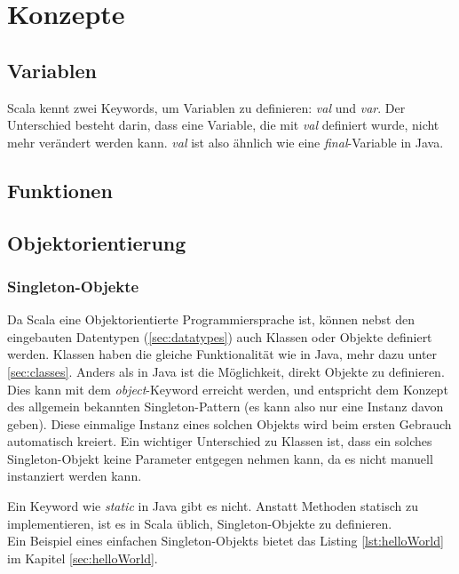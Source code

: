 \chapter{Konzepte}

\section{Variablen}

Scala kennt zwei Keywords, um Variablen zu definieren: \emph{val} und 
\emph{var}. Der Unterschied besteht darin, dass eine Variable, die mit
\emph{val} definiert wurde, nicht mehr verändert werden kann. \emph{val}
ist also ähnlich wie eine \emph{final}-Variable in Java.

\section{Funktionen}


\section{Objektorientierung}

\subsection{Singleton-Objekte}

Da Scala eine Objektorientierte Programmiersprache ist, können nebst
den eingebauten Datentypen (\ref{sec:datatypes}) auch Klassen oder
Objekte definiert werden. Klassen haben die gleiche Funktionalität
wie in Java, mehr dazu unter \ref{sec:classes}.  Anders als in Java
ist die Möglichkeit, direkt Objekte zu definieren.  Dies kann mit dem
\emph{object}-Keyword erreicht werden, und entspricht dem Konzept des
allgemein bekannten Singleton-Pattern (es kann also nur eine Instanz davon
geben). Diese einmalige Instanz eines solchen Objekts wird beim ersten
Gebrauch automatisch kreiert. Ein wichtiger Unterschied zu Klassen ist,
dass ein solches Singleton-Objekt keine Parameter entgegen nehmen kann,
da es nicht manuell instanziert werden kann.

Ein Keyword wie \emph{static} in Java gibt es nicht. Anstatt Methoden
statisch zu implementieren, ist es in Scala üblich, Singleton-Objekte
zu definieren.\\

Ein Beispiel eines einfachen Singleton-Objekts bietet das Listing
\ref{lst:helloWorld} im Kapitel \ref{sec:helloWorld}.

